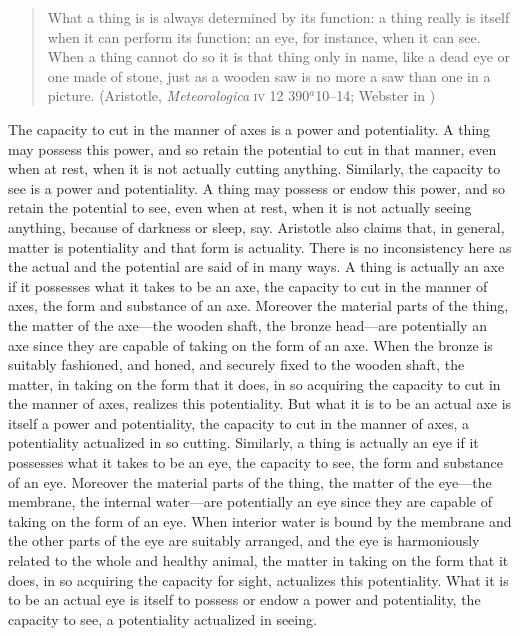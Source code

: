 \begin{quote}
	What a thing is is always determined by its function: a thing really is itself when it can perform its function; an eye, for instance, when it can see. When a thing cannot do so it is that thing only in name, like a dead eye or one made of stone, just as a wooden saw is no more a saw than one in a picture. (Aristotle, \emph{Meteorologica} \textsc{iv} 12 390\( ^{a} \)10--14; Webster in \citealt[86]{Barnes:1984uq})
\end{quote}

The capacity to cut in the manner of axes is a power and potentiality. A thing may possess this power, and so retain the potential to cut in that manner, even when at rest, when it is not actually cutting anything. Similarly, the capacity to see is a power and potentiality. A thing may possess or endow this power, and so retain the potential to see, even when at rest, when it is not actually seeing anything, because of darkness or sleep, say. Aristotle also claims that, in general, matter is potentiality and that form is actuality. There is no inconsistency here as the actual and the potential are said of in many ways. A thing is actually an axe if it possesses what it takes to be an axe, the capacity to cut in the manner of axes, the form and substance of an axe. Moreover the material parts of the thing, the matter of the axe---the wooden shaft, the bronze head---are potentially an axe since they are capable of taking on the form of an axe. When the bronze is suitably fashioned, and honed, and securely fixed to the wooden shaft, the matter, in taking on the form that it does, in so acquiring the capacity to cut in the manner of axes, realizes this potentiality. But what it is to be an actual axe is itself a power and potentiality, the capacity to cut in the manner of axes, a potentiality actualized in so cutting. Similarly, a thing is actually an eye if it possesses what it takes to be an eye, the capacity to see, the form and substance of an eye. Moreover the material parts of the thing, the matter of the eye---the membrane, the internal water---are potentially an eye since they are capable of taking on the form of an eye. When interior water is bound by the membrane and the other parts of the eye are suitably arranged, and the eye is harmoniously related to the whole and healthy animal, the matter in taking on the form that it does, in so acquiring the capacity for sight, actualizes this potentiality. What it is to be an actual eye is itself to possess or endow a power and potentiality, the capacity to see, a potentiality actualized in seeing.

